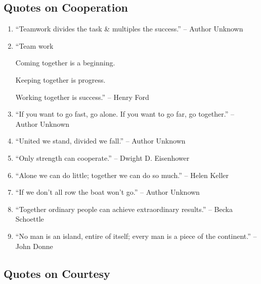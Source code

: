 \documentclass{article}
\begin{document}
\subsection{Quotes on Cooperation}

\begin{enumerate}
	\item ``Teamwork divides the task \& multiples the success.'' -- Author Unknown
	\item ``Team work

	Coming together is a beginning.

	Keeping together is progress.

	Working together is success.'' -- Henry Ford
	\item ``If you want to go fast, go alone. If you want to go far, go together.'' -- Author Unknown
	\item ``United we stand, divided we fall.'' -- Author Unknown
	\item ``Only strength can cooperate.'' -- Dwight D. Eisenhower
	\item ``Alone we can do little; together we can do so much.'' -- Helen Keller
	\item ``If we don't all row the boat won't go.'' -- Author Unknown
	\item ``Together ordinary people can achieve extraordinary results.'' -- Becka Schoettle
	\item ``No man is an island, entire of itself; every man is a piece of the continent.'' -- John Donne
\end{enumerate}

\subsection{Quotes on Courtesy}
\end{document}

